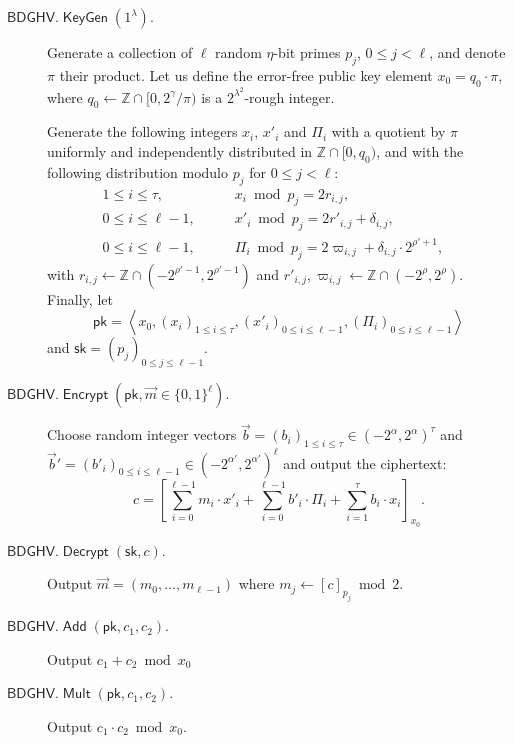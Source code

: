 \documentclass[11pt]{llncs}
\renewcommand\leq\leqslant
\newcommand{\Z}{{\mathbb Z}}
\DeclareMathOperator{\KeyGen}{\ensuremath{\mathsf{KeyGen}}}
\DeclareMathOperator{\Encrypt}{\ensuremath{\mathsf{Encrypt}}}
\DeclareMathOperator{\Decrypt}{\ensuremath{\mathsf{Decrypt}}}
\DeclareMathOperator{\Add}{\ensuremath{\mathsf{Add}}}
\DeclareMathOperator{\Mult}{\ensuremath{\mathsf{Mult}}}
\newcommand*{\pk}{\ensuremath{\mathsf{pk}}}
\newcommand*{\sk}{\ensuremath{\mathsf{sk}}}
\newcommand*{\BDGHV}{\ensuremath{\mathsf{BDGHV}}}
\begin{document}
\begin{description}
\item[$\BDGHV.\KeyGen(1^\lambda)$.] Generate a collection of $\ell$
random $\eta$-bit primes $p_j$, $0\leq j<\ell$, and denote $\pi$
their product. Let us define the error-free public key element
$x_0=q_0\cdot\pi$, where $q_0 \leftarrow \Z \cap [0,2^{\gamma}/\pi)$
  is a $2^{\lambda^2}$-rough integer.

  Generate the following integers $x_i$, $x'_i$ and $\varPi_i$ with a quotient by $\pi$ uniformly
  and independently distributed in $\Z\cap [0, q_0)$, and with the
    following distribution modulo $p_j$ for $0 \leq j < \ell$:
$$
\begin{array}{lll}
1 \leq i \leq \tau, & \qquad x_i\bmod p_j = 2r_{i,j},& \\[.2cm]

0\leq i\leq \ell-1, & \qquad x'_i\bmod p_j = 2r'_{i,j}+\delta_{i,j},& \\[.2cm]

0\leq i\leq \ell-1, & \qquad \varPi_i \bmod p_j = 2\varpi_{i,j} +
\delta_{i,j}\cdot 2^{\rho'+1},
\end{array}
$$
with $r_{i,j}\leftarrow\Z\cap(-2^{\rho'-1}, 2^{\rho'-1})$ and $r'_{i,j}, \varpi_{i,j}\leftarrow\Z\cap(-2^{\rho}, 2^{\rho})$. Finally, let 
$$\pk = \left\langle x_0, \left(x_i\right)_{1\leq i\leq \tau}, \left(x'_i\right)_{0\leq i\leq \ell-1}, \left(\varPi_i\right)_{0\leq i\leq {\ell-1}}\right\rangle$$
and $\sk=(p_j)_{0\leq j\leq {\ell-1}}$.

\item[$\BDGHV.\Encrypt(\pk, \vec{m} \in \{0,1\}^\ell)$.] Choose 
  random integer vectors $\vec b=(b_i)_{1\leq i\leq \tau}
  \in(-2^\alpha,2^{\alpha})^\tau$ and $\vec b'=(b'_i)_{0\leq i\leq
      \ell-1} \in(-2^{\alpha'},2^{\alpha'})^{\ell}$ 
and output the ciphertext:
\begin{equation}
\label{eq:encbdghv}
c = \left[\sum\limits_{i=0}^{\ell-1} m_i \cdot x'_i + 
	\sum_{i=0}^{\ell-1} b'_i\cdot \varPi_i  + \sum_{i=1}^\tau 
b_i\cdot x_i\right]_{x_0}.
\end{equation}
\item[$\BDGHV.\Decrypt(\sk, c)$.] Output $\vec{m}=(m_0,\ldots,m_{\ell-1})$ where $m_j \leftarrow [c]_{p_j} \bmod 2$.
\\\vspace{-0.25cm}
\item[$\BDGHV.\Add(\pk, c_1, c_2)$.] Output $c_1+c_2 \bmod x_0$
\\\vspace{-0.25cm}
\item[$\BDGHV.\Mult(\pk, c_1, c_2)$.] Output $c_1 \cdot c_2 \bmod x_0$.
\end{description}
\end{document}
